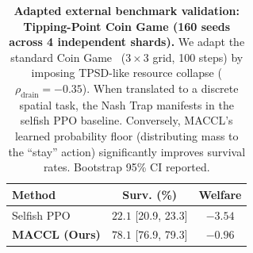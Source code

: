 \begin{table}[h]
\centering
\caption{%
  \textbf{Adapted external benchmark validation: Tipping-Point Coin Game (160 seeds across 4 independent shards).}
  We adapt the standard Coin Game~\citep{lerer2017maintaining} ($3{\times}3$ grid, 100 steps)
  by imposing TPSD-like resource collapse ($\rho_{\text{drain}}{=}-0.35$).
  When translated to a discrete spatial task, the Nash Trap manifests in the selfish PPO baseline.
  Conversely, MACCL's learned probability floor (distributing mass to the ``stay'' action) 
  significantly improves survival rates. Bootstrap 95\% CI reported.
}
\label{tab:coin_game_deep}
\small
\begin{tabular}{@{}lcc@{}}
\toprule
\textbf{Method} & \textbf{Surv. (\%)} & \textbf{Welfare} \\
\midrule
Selfish PPO & $22.1$ \tiny{[20.9, 23.3]} & $-3.54$ \\
\midrule
\textbf{MACCL (Ours)} & $\mathbf{78.1}$ \tiny{[76.9, 79.3]} & $\mathbf{-0.96}$ \\
\bottomrule
\end{tabular}
\end{table}
